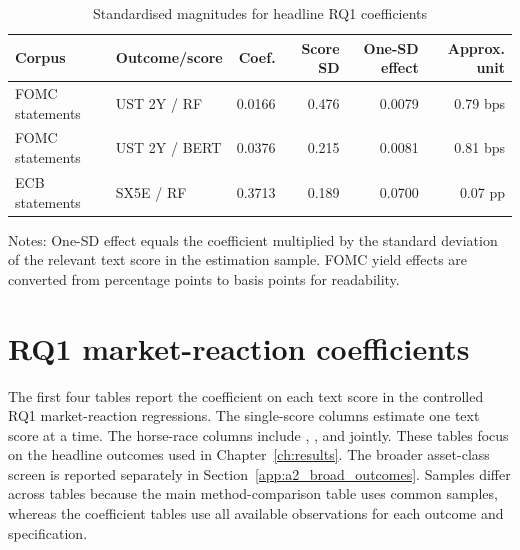 \begin{table}[H]
\centering
\caption{Standardised magnitudes for headline RQ1 coefficients}
\label{tab:a2_standardised_effects}
\begin{threeparttable}
\small
\begin{tabular}{llrrrr}
\toprule
Corpus & Outcome/score & Coef. & Score SD & One-SD effect & Approx. unit \\
\midrule
FOMC statements & UST 2Y / RF & 0.0166 & 0.476 & 0.0079 & 0.79 bps \\
FOMC statements & UST 2Y / BERT & 0.0376 & 0.215 & 0.0081 & 0.81 bps \\
ECB statements & SX5E / RF & 0.3713 & 0.189 & 0.0700 & 0.07 pp \\
\bottomrule
\end{tabular}
\begin{tablenotes}[flushleft]
\footnotesize
\item Notes: One-SD effect equals the coefficient multiplied by the standard
deviation of the relevant text score in the estimation sample. FOMC yield
effects are converted from percentage points to basis points for readability.
\end{tablenotes}
\end{threeparttable}
\end{table}


\section{RQ1 market-reaction coefficients}
\label{app:a2_rq1_coefficients}

The first four tables report the coefficient on each text score in the
controlled RQ1 market-reaction regressions. The single-score columns estimate
one text score at a time. The horse-race columns include \netscore{},
\rfscore{}, and \bertscore{} jointly. These tables focus on the headline
outcomes used in Chapter~\ref{ch:results}. The broader asset-class screen is
reported separately in Section~\ref{app:a2_broad_outcomes}. Samples differ
across tables because the main method-comparison table uses common samples,
whereas the coefficient tables use all available observations for each outcome
and specification.

